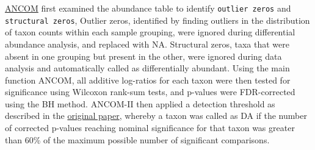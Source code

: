 \documentclass[
]{article}
\begin{document}
\href{https://www.frontiersin.org/articles/10.3389/fmicb.2017.02114/full}{ANCOM}
first examined the abundance table to identify \texttt{outlier\ zeros}
and \texttt{structural\ zeros}, Outlier zeros, identified by finding
outliers in the distribution of taxon counts within each sample
grouping, were ignored during differential abundance analysis, and
replaced with NA. Structural zeros, taxa that were absent in one
grouping but present in the other, were ignored during data analysis and
automatically called as differentially abundant. Using the main function
ANCOM, all additive log-ratios for each taxon were then tested for
significance using Wilcoxon rank-sum tests, and p-values were
FDR-corrected using the BH method. ANCOM-II then applied a detection
threshold as described in the
\href{https://www.ncbi.nlm.nih.gov/pmc/articles/PMC4450248/}{original
paper}, whereby a taxon was called as DA if the number of corrected
p-values reaching nominal significance for that taxon was greater than
60\% of the maximum possible number of significant comparisons.
\end{document}
